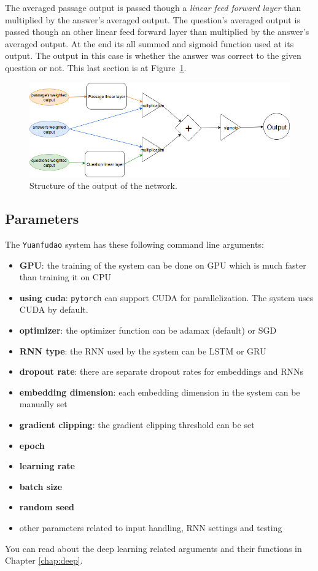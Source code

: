 The averaged passage output is passed though a \textit{linear feed forward layer} than multiplied by the answer's averaged output. The question's averaged output is passed though an other linear feed forward layer than multiplied by the answer's averaged output. At the end its all summed and sigmoid function used at its output. The output in this case is whether the answer was correct to the given question or not. This last section is at Figure~\ref{fig:output}.
\begin{figure}[!htb]
	\centering
	\includegraphics[scale=0.5]{TriAN_output.jpg}
	\caption{Structure of the output of the network.}
	\label{fig:output}
\end{figure}


\subsection{Parameters}
\begin{minipage}{\textwidth}
The \texttt{Yuanfudao} system has these following command line arguments:
\begin{itemize}
	\item \textbf{GPU}: the training of the system can be done on GPU which is much faster than training it on CPU
	\item \textbf{using cuda}: \texttt{pytorch} can support CUDA for parallelization. The system uses CUDA by default.
	\item \textbf{optimizer}: the optimizer function can be adamax (default) or SGD
	\item \textbf{RNN type}: the RNN used by the system can be LSTM or GRU
	\item \textbf{dropout rate}: there are separate dropout rates for embeddings and RNNs
	\item \textbf{embedding dimension}: each embedding dimension in the system can be manually set
	\item \textbf{gradient clipping}: the gradient clipping threshold can be set
	\item \textbf{epoch}
	\item \textbf{learning rate}
	\item \textbf{batch size}
	\item \textbf{random seed}
	\item other parameters related to input handling, RNN settings and testing
\end{itemize}
You can read about the deep learning related arguments and their functions in Chapter \ref{chap:deep}.
\end{minipage}

